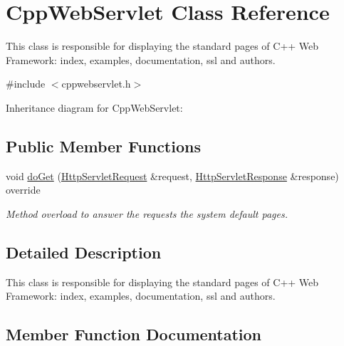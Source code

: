 \hypertarget{class_cpp_web_servlet}{}\section{Cpp\+Web\+Servlet Class Reference}
\label{class_cpp_web_servlet}


This class is responsible for displaying the standard pages of C++ Web Framework\+: index, examples, documentation, ssl and authors.  




{\ttfamily \#include $<$cppwebservlet.\+h$>$}



Inheritance diagram for Cpp\+Web\+Servlet\+:
\subsection*{Public Member Functions}
\begin{DoxyCompactItemize}
\item 
void \hyperlink{class_cpp_web_servlet_a8d32d5ba8ba73c10a7c1abc81497d898}{do\+Get} (\hyperlink{class_http_servlet_request}{Http\+Servlet\+Request} \&request, \hyperlink{class_http_servlet_response}{Http\+Servlet\+Response} \&response) override
\begin{DoxyCompactList}\small\item\em Method overload to answer the requests the system default pages. \end{DoxyCompactList}\end{DoxyCompactItemize}


\subsection{Detailed Description}
This class is responsible for displaying the standard pages of C++ Web Framework\+: index, examples, documentation, ssl and authors. 

\subsection{Member Function Documentation}
\mbox{\label{class_cpp_web_servlet_a8d32d5ba8ba73c10a7c1abc81497d898}} 

